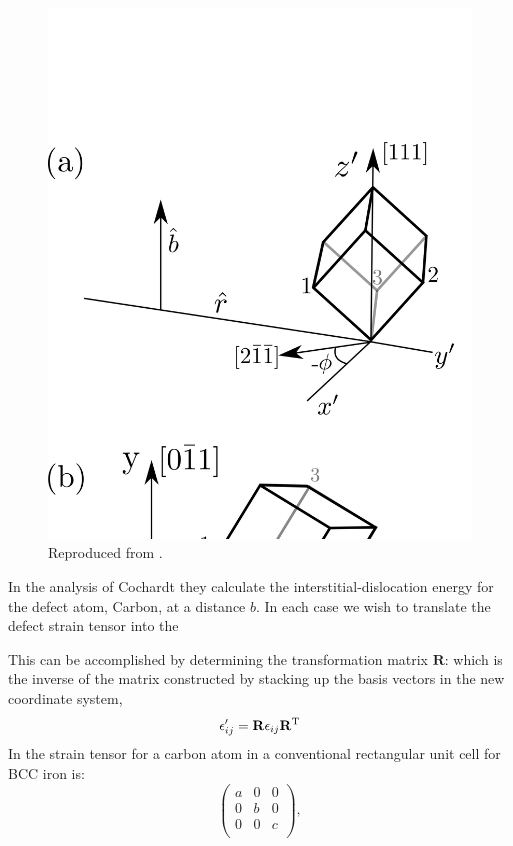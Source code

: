 \begin{figure}[!tbp]
\begin{center}
\includegraphics[scale=0.8]{screwcoordinate.png}
\caption{\label{fig:interstitialcoords} Reproduced from \cite{cochardt55}.}
\end{center}
\end{figure}
%
In the analysis of Cochardt they calculate the interstitial-dislocation
energy for the defect atom, Carbon, at a distance $b$. In each case we
wish to translate the defect strain tensor into the

This can be accomplished by determining the transformation matrix $\mathbf{R}$:
which is the inverse of the matrix constructed by stacking up
the basis vectors in the new coordinate system,
%
\begin{equation}
\epsilon'_{ij} = \mathbf{R} \epsilon_{ij} \mathbf{R}^{\rm T}
\end{equation}
%
In \cite{cochardt55} the strain tensor for a carbon atom in
a conventional rectangular unit cell for BCC iron is:
%
\begin{equation}
\left(
\begin{array}{ccc}
 a & 0 & 0 \\
 0 & b & 0 \\
 0 & 0 & c  \\
\end{array}
\right),
\end{equation}
%

